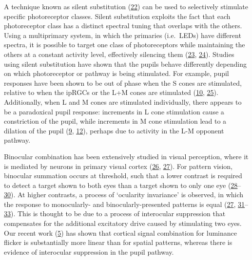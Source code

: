 \documentclass[
]{article}
\begin{document}
A technique known as silent substitution (\protect\hyperlink{ref-Estevez1982}{22}) can be used to selectively stimulate specific photoreceptor classes. Silent substitution exploits the fact that each photoreceptor class has a distinct spectral tuning that overlaps with the others. Using a multiprimary system, in which the primaries (i.e.~LEDs) have different spectra, it is possible to target one class of photoreceptors while maintaining the others at a constant activity level, effectively silencing them (\protect\hyperlink{ref-Shapiro1996}{23}, \protect\hyperlink{ref-Spitschan2018}{24}). Studies using silent substitution have shown that the pupils behave differently depending on which photoreceptor or pathway is being stimulated. For example, pupil responses have been shown to be out of phase when the S cones are stimulated, relative to when the ipRGCs or the L+M cones are stimulated (\protect\hyperlink{ref-Spitschan2014}{10}, \protect\hyperlink{ref-Cao2015}{25}). Additionally, when L and M cones are stimulated individually, there appears to be a paradoxical pupil response: increments in L cone stimulation cause a constriction of the pupil, while increments in M cone stimulation lead to a dilation of the pupil (\protect\hyperlink{ref-Murray2018}{9}, \protect\hyperlink{ref-Woelders2018}{12}), perhaps due to activity in the L-M opponent pathway.

Binocular combination has been extensively studied in visual perception, where it is mediated by neurons in primary visual cortex (\protect\hyperlink{ref-Hubel1962}{26}, \protect\hyperlink{ref-Moradi2009}{27}). For pattern vision, binocular summation occurs at threshold, such that a lower contrast is required to detect a target shown to both eyes than a target shown to only one eye (\protect\hyperlink{ref-Baker2018}{28}--\protect\hyperlink{ref-Legge1984}{30}). At higher contrasts, a process of `ocularity invariance' is observed, in which the response to monocularly- and binocularly-presented patterns is equal (\protect\hyperlink{ref-Moradi2009}{27}, \protect\hyperlink{ref-Baker2007}{31}--\protect\hyperlink{ref-Meese2006}{33}). This is thought to be due to a process of interocular suppression that compensates for the additional excitatory drive caused by stimulating two eyes. Our recent work (\protect\hyperlink{ref-Segala2023}{5}) has shown that cortical signal combination for luminance flicker is substantially more linear than for spatial patterns, whereas there is evidence of interocular suppression in the pupil pathway.
\end{document}
